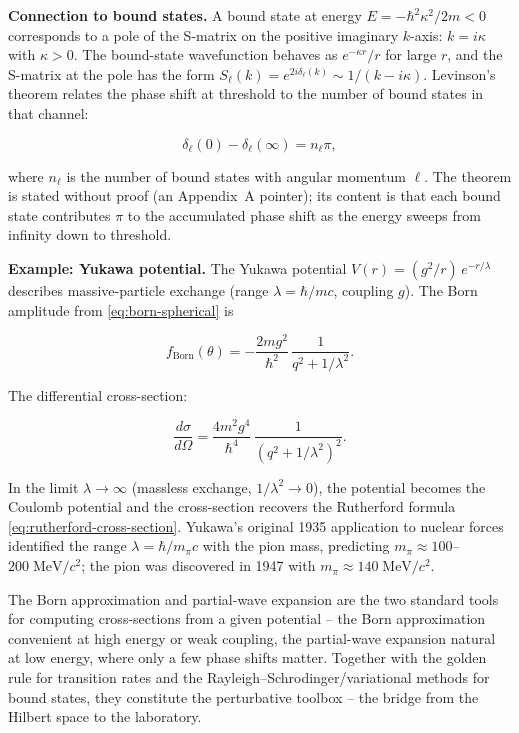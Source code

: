 \medskip\noindent\textbf{Connection to bound states.}
A bound state at energy $E = -\hbar^{2}\kappa^{2}/2m < 0$ corresponds to a pole of the S-matrix on the positive imaginary $k$-axis: $k = i\kappa$ with $\kappa > 0$. The bound-state wavefunction behaves as $e^{-\kappa r}/r$ for large $r$, and the S-matrix at the pole has the form $S_{\ell}(k) = e^{2i\delta_{\ell}(k)} \sim 1/(k-i\kappa)$. Levinson's theorem relates the phase shift at threshold to the number of bound states in that channel:
\begin{linenomath}
\begin{equation*}
\delta_{\ell}(0) - \delta_{\ell}(\infty) = n_{\ell}\pi,
\end{equation*}
\end{linenomath}
where $n_{\ell}$ is the number of bound states with angular momentum $\ell$. The theorem is stated without proof (an Appendix~A pointer); its content is that each bound state contributes $\pi$ to the accumulated phase shift as the energy sweeps from infinity down to threshold.

\medskip\noindent\textbf{Example: Yukawa potential.}
The Yukawa potential $V(r) = (g^{2}/r)\,e^{-r/\lambda}$ describes massive-particle exchange (range $\lambda = \hbar/mc$, coupling $g$). The Born amplitude from \eqref{eq:born-spherical} is
\begin{linenomath}
\begin{equation}
f_{\text{Born}}(\theta) = -\frac{2mg^{2}}{\hbar^{2}}\,\frac{1}{q^{2} + 1/\lambda^{2}}.
\label{eq:born-yukawa}
\end{equation}
\end{linenomath}
The differential cross-section:
\begin{linenomath}
\begin{equation*}
\frac{d\sigma}{d\Omega} = \frac{4m^{2}g^{4}}{\hbar^{4}}\,\frac{1}{(q^{2} + 1/\lambda^{2})^{2}}.
\end{equation*}
\end{linenomath}
In the limit $\lambda \to \infty$ (massless exchange, $1/\lambda^{2} \to 0$), the potential becomes the Coulomb potential and the cross-section recovers the Rutherford formula \eqref{eq:rutherford-cross-section}. Yukawa's original 1935 application to nuclear forces identified the range $\lambda = \hbar/m_{\pi}c$ with the pion mass, predicting $m_{\pi} \approx 100$--$200\;\text{MeV}/c^{2}$; the pion was discovered in 1947 with $m_{\pi} \approx 140\;\text{MeV}/c^{2}$.

The Born approximation and partial-wave expansion are the two standard tools for computing cross-sections from a given potential -- the Born approximation convenient at high energy or weak coupling, the partial-wave expansion natural at low energy, where only a few phase shifts matter. Together with the golden rule for transition rates and the Rayleigh--Schrodinger/variational methods for bound states, they constitute the perturbative toolbox -- the bridge from the Hilbert space to the laboratory.

